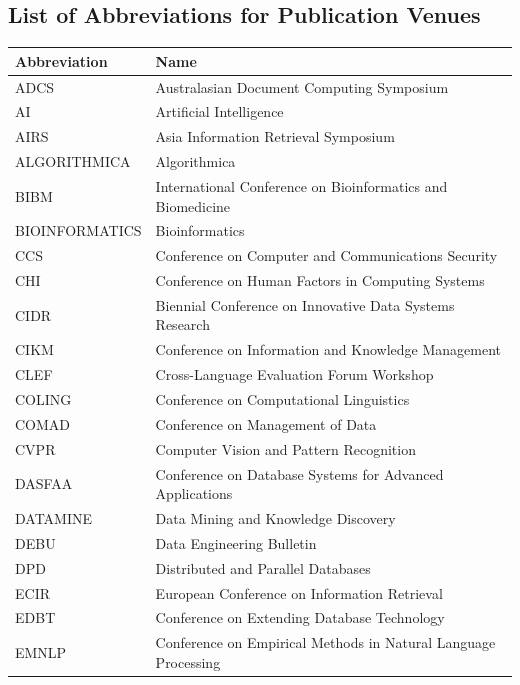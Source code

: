 \documentclass[msc]{ppgccufmg}
\begin{document}
\begin{appendices}
\chapter{List of Abbreviations for Publication Venues}\label{sec:venues}

\begin{table}[h]
\scriptsize
\centering
\begin{tabular}{ll} 
\toprule
Abbreviation & Name          \\
\midrule
ADCS					&		Australasian Document Computing Symposium  \\ 
AI					&		Artificial Intelligence  \\ 
AIRS					&		Asia Information Retrieval Symposium  \\ 
ALGORITHMICA					&		Algorithmica  \\ 
BIBM					&		International Conference on Bioinformatics and Biomedicine  \\ 
BIOINFORMATICS					&		Bioinformatics  \\ 
CCS					&		Conference on Computer and Communications Security  \\ 
CHI					&		Conference on Human Factors in Computing Systems  \\ 
CIDR					&		Biennial Conference on Innovative Data Systems Research  \\ 
CIKM					&		Conference on Information and Knowledge Management  \\ 
CLEF					&		Cross-Language Evaluation Forum Workshop  \\ 
COLING					&		Conference on Computational Linguistics  \\ 
COMAD					&		Conference on Management of Data  \\ 
CVPR					&		Computer Vision and Pattern Recognition  \\ 
DASFAA					&		Conference on Database Systems for Advanced Applications  \\ 
DATAMINE					&		Data Mining and Knowledge Discovery  \\ 
DEBU					&		Data Engineering Bulletin  \\ 
DPD					&		Distributed and Parallel Databases  \\ 
ECIR					&		European Conference on Information Retrieval  \\ 
EDBT					&		Conference on Extending Database Technology  \\ 
EMNLP					&		Conference on Empirical Methods in Natural Language Processing  \\ 

\end{tabular}
\end{table}
\end{appendices}
\end{document}

